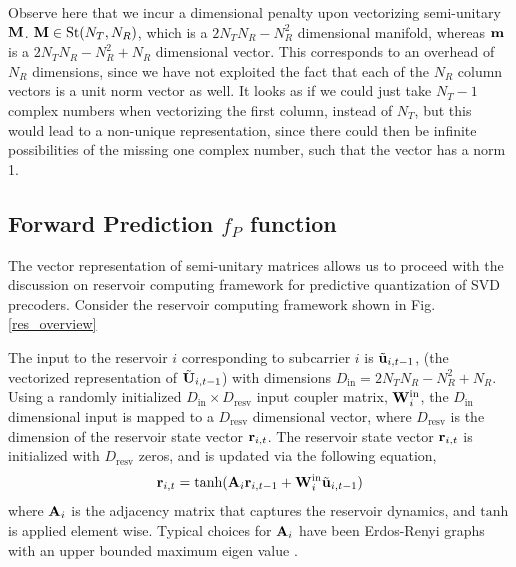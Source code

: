 \documentclass[conference]{IEEEtran}
\begin{document}
Observe here that we incur a dimensional penalty upon vectorizing semi-unitary $\mathcal{{\bf M}}$.
$\mathcal{{\bf M}} \in \text{St}(N_T,N_R)$, which is a $2N_TN_R-N_R^2$ dimensional manifold, whereas $\mathcal{{\bf m}}$ is a $2N_TN_R-N_R^2+N_R$ dimensional vector. This corresponds to an overhead of $N_R$ dimensions, since we have not exploited the fact that each of the $N_R$ column vectors is a unit norm vector as well.
It looks as if we could just take $N_T-1$ complex numbers when vectorizing the first column, instead of $N_T$, but this would lead to a non-unique representation, since there could then be infinite possibilities of the missing one complex number, such that the vector has a norm 1.
\subsection{Forward Prediction $f_P$ function}
\noindent The vector representation of semi-unitary matrices allows us to proceed with the discussion on reservoir computing framework for predictive quantization of SVD precoders.
Consider the reservoir computing framework shown in Fig. \ref{res_overview} %

The input to the reservoir $i$ corresponding to subcarrier $i$ is $\tilde{{\bf u}}_{i,t-1}$, (the vectorized representation of $\tilde{{\bf U}}_{i,t-1}$) with dimensions $D_{\text{in}}=2N_TN_R-N_R^2+N_R$.
Using a randomly initialized $D_{\text{in}}\times D_{\text{resv}}$ input coupler matrix, ${\bf W}^{\text{in}}_i$, the $D_{\text{in}}$ dimensional input is mapped to a $D_{\text{resv}}$ dimensional vector, where $D_{\text{resv}}$ is the dimension of the reservoir state vector ${\bf r}_{i,t}$.
The reservoir state vector ${\bf r}_{i,t}$ is initialized with $D_{\text{resv}}$ zeros, and is updated via the following equation,
\begin{equation}
\br_{i,t}=\text{tanh}(\bA_i\br_{i,t-1}+\bW^{\text{in}}_i\tilde{\bu}_{i,t-1})
\label{res_upd}
\end{equation}
where ${\bf A}_i$ is the adjacency matrix that captures the reservoir dynamics, and $\text{tanh}$ is applied element wise.
Typical choices for ${\bf A}_i$ have been Erdos-Renyi graphs with an upper bounded maximum eigen value \cite{mosleh2017brain,pathak2017using}.
\end{document}
